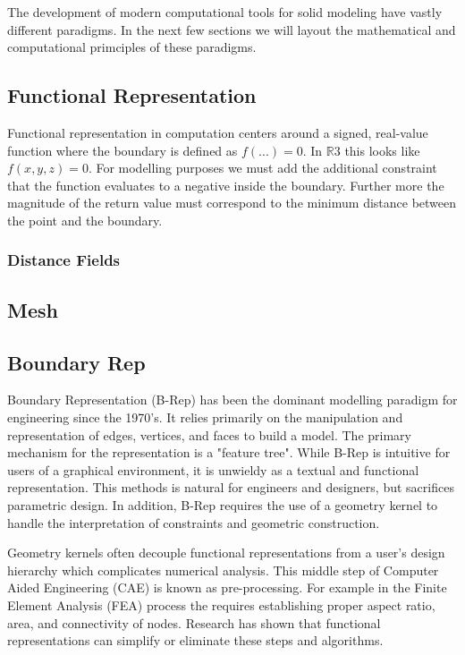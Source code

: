 \documentclass[a4paper]{article}
\begin{document}
The development of modern
computational tools for solid modeling have vastly different paradigms. In
the next few sections we will layout the mathematical and computational
primciples of these paradigms.

\subsection{Functional Representation}

Functional representation in computation centers around a signed, real-value
function where the boundary is defined as $f(...) = 0$.
In $\mathbb{R}3$ this looks like $f(x,y,z) = 0$. For modelling purposes we must add the
additional constraint that the function evaluates to a negative inside the
boundary. Further more the magnitude of the return value must correspond to
the minimum distance between the point and the boundary.


\subsubsection{Distance Fields}


\subsection{Mesh}


\subsection{Boundary Rep}
Boundary Representation (B-Rep) has been the dominant modelling paradigm
for engineering since the 1970's.
It relies primarily on the manipulation and representation of
edges, vertices, and faces to build a model.
The primary mechanism for the representation is a "feature tree".
While B-Rep is intuitive for users of a graphical environment,
it is unwieldy as a textual and functional representation.
This methods is natural for engineers and designers, but sacrifices
parametric design. In addition, B-Rep requires the use of a geometry kernel
to handle the interpretation of constraints and geometric construction. \cite{stroud2006boundary}

Geometry kernels often decouple functional representations from a user's design
hierarchy which complicates numerical analysis.\cite{lee2005cad}
This middle step of Computer Aided Engineering (CAE) is known as pre-processing.
For example in the Finite Element Analysis (FEA) process the requires
establishing proper aspect ratio, area, and connectivity of nodes. Research has shown that functional representations can simplify or eliminate these steps and algorithms.
\end{document}
